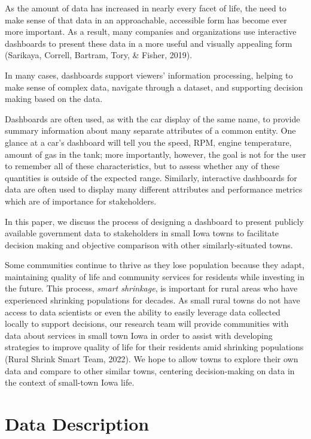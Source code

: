 \documentclass[print]{nuthesis}
\begin{document}
As the amount of data has increased in nearly every facet of life, the need to make sense of that data in an approachable, accessible form has become ever more important.
As a result, many companies and organizations use interactive dashboards to present these data in a more useful and visually appealing form (Sarikaya, Correll, Bartram, Tory, \& Fisher, 2019).

In many cases, dashboards support viewers' information processing, helping to make sense of complex data, navigate through a dataset, and supporting decision making based on the data.

Dashboards are often used, as with the car display of the same name, to provide summary information about many separate attributes of a common entity. One glance at a car's dashboard will tell you the speed, RPM, engine temperature, amount of gas in the tank; more importantly, however, the goal is not for the user to remember all of these characteristics, but to assess whether any of these quantities is outside of the expected range.
Similarly, interactive dashboards for data are often used to display many different attributes and performance metrics which are of importance for stakeholders.

In this paper, we discuss the process of designing a dashboard to present publicly available government data to stakeholders in small Iowa towns to facilitate decision making and objective comparison with other similarly-situated towns.

Some communities continue to thrive as they lose population because they adapt, maintaining quality of life and community services for residents while investing in the future. This process, \emph{smart shrinkage}, is important for rural areas who have experienced shrinking populations for decades. As small rural towns do not have access to data scientists or even the ability to easily leverage data collected locally to support decisions, our research team will provide communities with data about services in small town Iowa in order to assist with developing strategies to improve quality of life for their residents amid shrinking populations (Rural Shrink Smart Team, 2022). We hope to allow towns to explore their own data and compare to other similar towns, centering decision-making on data in the context of small-town Iowa life.

\hypertarget{data-description}{%
\section{Data Description}\label{data-description}}
\end{document}
